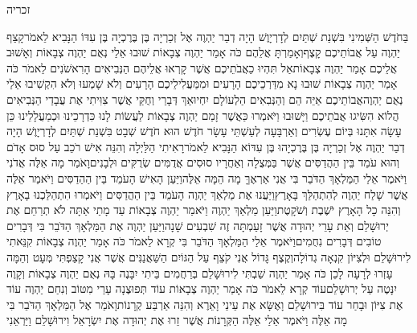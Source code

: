 \documentclass[../main/main.tex]{subfiles}
\begin{document}
\Incipit{}זכריה\par
\vspace{\afterchapskip}
\RTLmulticolcolumns
\begin{multicols}{\ncols}
בַּחֹדֶשׁ הַשְּׁמִינִי בִּשְׁנַת שְׁתַּיִם לְדָרְיָוֶשׁ הָיָה דְבַר יַהְוֶה אֶל זְכַרְיָה בֶּן בֶּרֶכְיָה בֶּן עִדּוֹ הַנָּבִיא לֵאמֹר\PreVerseSpace{}קָצַף יַהְוֶה עַל אֲבוֹתֵיכֶם קָצֶף\PreVerseSpace{}וְאָמַרְתָּ אֲלֵהֶם כֹּה אָמַר יַהְוֶה צְבָאוֹת שׁוּבוּ אֵלַי נְאֻם יַהְוֶה צְבָאוֹת וְאָשׁוּב אֲלֵיכֶם אָמַר יַהְוֶה צְבָאוֹת\PreVerseSpace{}אַל תִּהְיוּ כַאֲבֹתֵיכֶם אֲשֶׁר קָרְאוּ אֲלֵיהֶם הַנְּבִיאִים הָרִאשֹׁנִים לֵאמֹר כֹּה אָמַר יַהְוֶה צְבָאוֹת שׁוּבוּ נָא מִדַּרְכֵיכֶם הָרָעִים וּמִמַּעֲלִילֵיכֶם\SubEnd{} הָרָעִים וְלֹא שָׁמְעוּ וְלֹא הִקְשִׁיבוּ אֵלַי נְאֻם יַהְוֶה\PreVerseSpace{}אֲבוֹתֵיכֶם אַיֵּה הֵם וְהַנְּבִאִים הַלְעוֹלָם יִחְיוּ\PreVerseSpace{}אַךְ דְּבָרַי וְחֻקַּי אֲשֶׁר צִוִּיתִי אֶת עֲבָדַי הַנְּבִיאִים הֲלוֹא הִשִּׂיגוּ אֲבֹתֵיכֶם וַיָּשׁוּבוּ וַיֹּאמְרוּ כַּאֲשֶׁר זָמַם יַהְוֶה צְבָאוֹת לַעֲשׂוֹת לָנוּ כִּדְרָכֵינוּ וּכְמַעֲלָלֵינוּ כֵּן עָשָׂה אִתָּנוּ \ClosedSection{}בְּיוֹם עֶשְׂרִים וְאַרְבָּעָה לְעַשְׁתֵּי עָשָׂר חֹדֶשׁ הוּא חֹדֶשׁ שְׁבָט בִּשְׁנַת שְׁתַּיִם לְדָרְיָוֶשׁ הָיָה דְבַר יַהְוֶה אֶל זְכַרְיָה בֶּן בֶּרֶכְיָהוּ בֶּן עִדּוֹא הַנָּבִיא לֵאמֹר\PreVerseSpace{}רָאִיתִי הַלַּיְלָה וְהִנֵּה אִישׁ רֹכֵב עַל סוּס אָדֹם וְהוּא עֹמֵד בֵּין הַהֲדַסִּים אֲשֶׁר בַּמְּצֻלָה וְאַחֲרָיו סוּסִים אֲדֻמִּים שְׂרֻקִּים וּלְבָנִים\PreVerseSpace{}וָאֹמַר מָה אֵלֶּה אֲדֹנִי וַיֹּאמֶר אֵלַי הַמַּלְאָךְ הַדֹּבֵר בִּי אֲנִי אַרְאֶךָּ מָה הֵמָּה אֵלֶּה\PreVerseSpace{}וַיַּעַן הָאִישׁ הָעֹמֵד בֵּין הַהַדַסִּים וַיֹּאמַר אֵלֶּה אֲשֶׁר שָׁלַח יַהְוֶה לְהִתְהַלֵּךְ בָּאָרֶץ\PreVerseSpace{}וַיַּעֲנוּ אֶת מַלְאַךְ יַהְוֶה הָעֹמֵד בֵּין הַהֲדַסִּים וַיֹּאמְרוּ הִתְהַלַּכְנוּ בָאָרֶץ וְהִנֵּה כָל הָאָרֶץ יֹשֶׁבֶת וְשֹׁקָטֶת\PreVerseSpace{}וַיַּעַן מַלְאַךְ יַהְוֶה וַיֹּאמַר יַהְוֶה צְבָאוֹת עַד מָתַי אַתָּה לֹא תְרַחֵם אֶת יְרוּשָׁלֵם וְאֵת עָרֵי יְהוּדָה אֲשֶׁר זָעַמְתָּה זֶה שִׁבְעִים שָׁנָה\PreVerseSpace{}וַיַּעַן יַהְוֶה אֶת הַמַּלְאָךְ הַדֹּבֵר בִּי דְּבָרִים טוֹבִים דְּבָרִים נִחֻמִים\PreVerseSpace{}וַיֹּאמֶר אֵלַי הַמַּלְאָךְ הַדֹּבֵר בִּי קְרָא לֵאמֹר כֹּה אָמַר יַהְוֶה צְבָאוֹת קִנֵּאתִי לִירוּשָׁלֵם וּלְצִיּוֹן קִנְאָה גְדוֹלָה\PreVerseSpace{}וְקֶצֶף גָּדוֹל אֲנִי קֹצֵף עַל הַגּוֹיִם הַשַּׁאֲנַנִּים אֲשֶׁר אֲנִי קָצַפְתִּי מְּעָט וְהֵמָּה עָזְרוּ לְרָעָה \ClosedSection{}לָכֵן כֹּה אָמַר יַהְוֶה שַׁבְתִּי לִירוּשָׁלֵם בְּרַחֲמִים בֵּיתִי יִבָּנֶה בָּהּ נְאֻם יַהְוֶה צְבָאוֹת וְקָוֶה יִנָּטֶה עַל יְרוּשָׁלֵם\PreVerseSpace{}עוֹד קְרָא לֵאמֹר כֹּה אָמַר יַהְוֶה צְבָאוֹת עוֹד תְּפוּצֶנָה עָרַי מִטּוֹב וְנִחַם יַהְוֶה עוֹד אֶת צִיּוֹן וּבָחַר עוֹד בִּירוּשָׁלֵם \ClosedSection{}וָאֶשָּׂא אֶת עֵינַי וָאֵרֶא וְהִנֵּה אַרְבַּע קְרָנוֹת\PreVerseSpace{}וָאֹמַר אֶל הַמַּלְאָךְ הַדֹּבֵר בִּי מָה אֵלֶּה וַיֹּאמֶר אֵלַי אֵלֶּה הַקְּרָנוֹת אֲשֶׁר זֵרוּ אֶת יְהוּדָה אֶת יִשְׂרָאֵל וִירוּשָׁלֵם \ClosedSection{}וַיַּרְאֵנִי 
\end{multicols}
\end{document}
